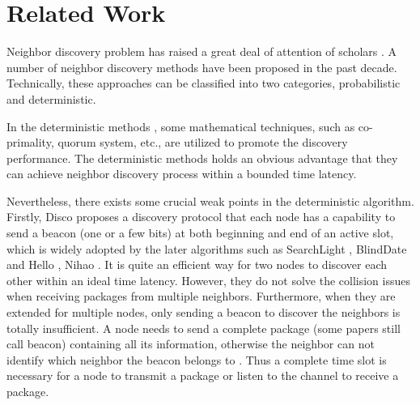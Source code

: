 \section{Related Work}
\label{RW}









Neighbor discovery problem has raised a great deal of attention of scholars \cite{sun2014energy}. 
A number of neighbor discovery methods have been proposed in the past decade.
Technically, these approaches can be classified into two categories, probabilistic and deterministic. 

In the deterministic methods \cite{dutta2008practical,kandhalu2010u,
bakht2012searchlight,sun2014hello,chen2015heterogeneous,
wang2015blinddate,qiu2016talk}, some mathematical techniques, such as
co-primality, quorum system, etc., are utilized to promote the discovery performance.
The deterministic methods holds an obvious advantage that they
can achieve neighbor discovery process within a bounded time latency.

Nevertheless, there exists some crucial weak points in the deterministic algorithm.
Firstly, Disco \cite{dutta2008practical} proposes a discovery protocol that
each node has a capability to send a beacon (one or a few bits) at both beginning and end of
an active slot, which is widely adopted by the later algorithms such as
SearchLight \cite{bakht2012searchlight}, BlindDate \cite{wang2015blinddate}
and Hello \cite{sun2014hello}, Nihao \cite{qiu2016talk}. It is quite an efficient way for two nodes to discover
each other within an ideal time latency. However,  they do not solve the collision 
issues when receiving packages from multiple neighbors. Furthermore, when they are 
extended for multiple nodes, only sending a beacon to discover the neighbors is 
totally insufficient. A node needs to send a complete package 
(some papers still call beacon) containing all its information,
otherwise the neighbor can not  identify which neighbor the beacon belongs to \cite{zhou2004impact}.
Thus a complete time slot is necessary for a node to transmit a package or listen to 
the channel to receive a package.

